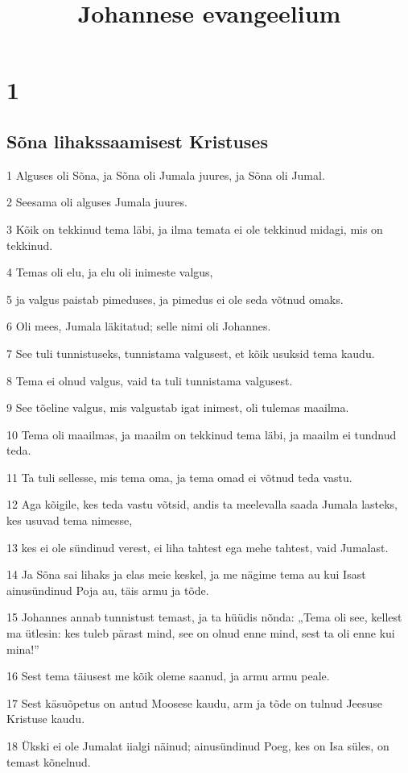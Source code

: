 

\title{Johannese evangeelium}

\chapter{1}

\section*{Sõna lihakssaamisest Kristuses}

\par 1 Alguses oli Sõna, ja Sõna oli Jumala juures, ja Sõna oli Jumal.
\par 2 Seesama oli alguses Jumala juures.
\par 3 Kõik on tekkinud tema läbi, ja ilma temata ei ole tekkinud midagi, mis on tekkinud.
\par 4 Temas oli elu, ja elu oli inimeste valgus,
\par 5 ja valgus paistab pimeduses, ja pimedus ei ole seda võtnud omaks.
\par 6 Oli mees, Jumala läkitatud; selle nimi oli Johannes.
\par 7 See tuli tunnistuseks, tunnistama valgusest, et kõik usuksid tema kaudu.
\par 8 Tema ei olnud valgus, vaid ta tuli tunnistama valgusest.
\par 9 See tõeline valgus, mis valgustab igat inimest, oli tulemas maailma.
\par 10 Tema oli maailmas, ja maailm on tekkinud tema läbi, ja maailm ei tundnud teda.
\par 11 Ta tuli sellesse, mis tema oma, ja tema omad ei võtnud teda vastu.
\par 12 Aga kõigile, kes teda vastu võtsid, andis ta meelevalla saada Jumala lasteks, kes usuvad tema nimesse,
\par 13 kes ei ole sündinud verest, ei liha tahtest ega mehe tahtest, vaid Jumalast.
\par 14 Ja Sõna sai lihaks ja elas meie keskel, ja me nägime tema au kui Isast ainusündinud Poja au, täis armu ja tõde.
\par 15 Johannes annab tunnistust temast, ja ta hüüdis nõnda: „Tema oli see, kellest ma ütlesin: kes tuleb pärast mind, see on olnud enne mind, sest ta oli enne kui mina!”
\par 16 Sest tema täiusest me kõik oleme saanud, ja armu armu peale.
\par 17 Sest käsuõpetus on antud Moosese kaudu, arm ja tõde on tulnud Jeesuse Kristuse kaudu.
\par 18 Ükski ei ole Jumalat iialgi näinud; ainusündinud Poeg, kes on Isa süles, on temast kõnelnud.

